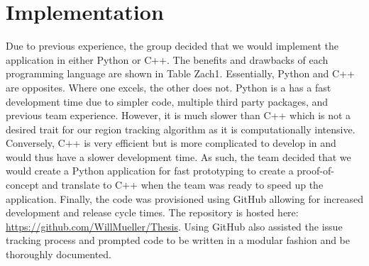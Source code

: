 \documentclass{article}
\begin{document}
\section{Implementation}
		Due to previous experience, the group decided that we would implement the application in either Python or C++. The benefits and drawbacks of each programming language are shown in Table Zach1. Essentially, Python and C++ are opposites. Where one excels, the other does not. Python is a has a fast development time due to simpler code, multiple third party packages, and previous team experience. However, it is much slower than C++ which is not a desired trait for our region tracking algorithm as it is computationally intensive. Conversely, C++ is very efficient but is more complicated to develop in and would thus have a slower development time. As such, the team decided that we would create a Python application for fast prototyping to create a proof-of-concept and translate to C++ when the team was ready to speed up the application. Finally, the code was provisioned using GitHub allowing for increased development and release cycle times. The repository is hosted here: \url{https://github.com/WillMueller/Thesis}. Using GitHub also assisted the issue tracking process and prompted code to be written in a modular fashion and be thoroughly documented. 
      
\end{document}
